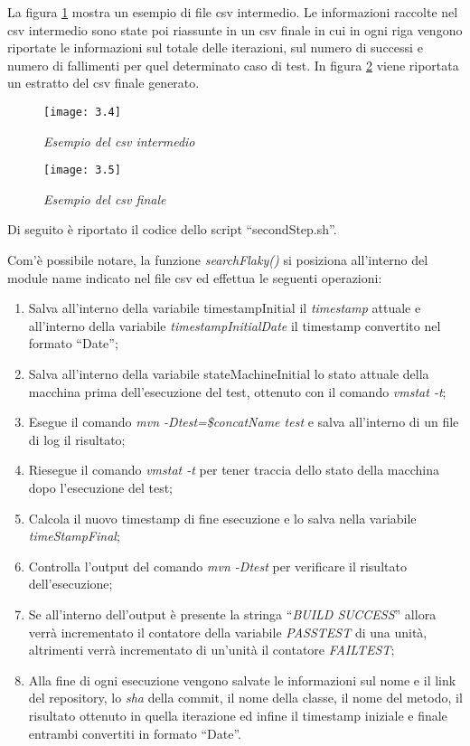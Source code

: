 La figura \ref{fig:csvIntermedio} mostra un esempio di file csv intermedio. Le informazioni raccolte nel csv intermedio sono state poi riassunte in un csv finale in cui in ogni riga vengono riportate le informazioni sul totale delle iterazioni, sul numero di successi e numero di fallimenti per quel determinato caso di test. In figura \ref{fig:csvFinale} viene riportata un estratto del csv finale generato.
\newpage
\begin{figure}[h]
	\centering
	\texttt{[image: 3.4]}
	\caption{\emph{Esempio del csv intermedio}}
	\label{fig:csvIntermedio}
\end{figure}
\begin{figure}[h]
	\centering
	\texttt{[image: 3.5]}
	\caption{\emph{Esempio del csv finale}}
	\label{fig:csvFinale}
\end{figure}

Di seguito è riportato il codice dello script “secondStep.sh”.


Com’è possibile notare, la funzione \emph{searchFlaky()} si posiziona all’interno del module name indicato nel file csv ed effettua le seguenti operazioni:
\begin{enumerate}
	\item Salva all’interno della variabile timestampInitial il \emph{timestamp} attuale e all’interno della variabile \emph{timestampInitialDate} il timestamp convertito nel
	formato “Date”;
	\item Salva all’interno della variabile stateMachineInitial lo stato attuale della macchina prima dell’esecuzione del test, ottenuto con il comando \emph{vmstat -t};
	\item Esegue il comando \emph{mvn -Dtest=\$concatName test} e salva all’interno di un file di log il risultato;
	\item Riesegue il comando \emph{vmstat -t} per tener traccia dello stato della macchina dopo l’esecuzione del test;
	\item Calcola il nuovo timestamp di fine esecuzione e lo salva nella variabile	\emph{timeStampFinal};
	\item Controlla l’output del comando \emph{mvn -Dtest} per verificare il risultato dell’esecuzione;
	\item Se all’interno dell’output è presente la stringa “\emph{BUILD SUCCESS}” allora verrà incrementato il contatore della variabile \emph{PASSTEST} di una unità, altrimenti verrà incrementato di un’unità il contatore \emph{FAILTEST};
	\item Alla fine di ogni esecuzione vengono salvate le informazioni sul nome e il
	link del repository, lo \emph{sha} della commit, il nome della classe, il nome del metodo, il risultato ottenuto in quella iterazione ed infine il timestamp iniziale e finale entrambi convertiti in formato “Date”.
\end{enumerate}

